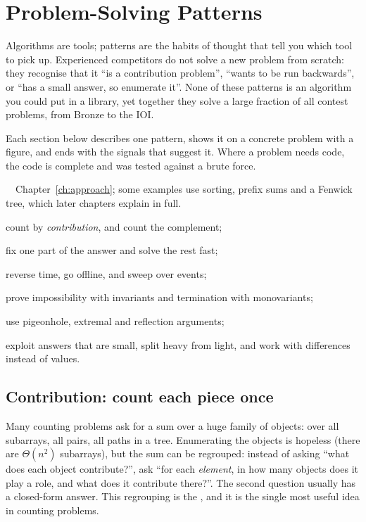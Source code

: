 \chapter{Problem-Solving Patterns}\label{ch:patterns}

Algorithms are tools; patterns are the habits of thought that tell you which tool to pick up. Experienced competitors do not
solve a new problem from scratch: they recognise that it ``is a contribution problem'', ``wants to be run backwards'', or
``has a small answer, so enumerate it''. None of these patterns is an algorithm you could put in a library, yet together
they solve a large fraction of all contest problems, from Bronze to the IOI.

Each section below describes one pattern, shows it on a concrete problem with a figure, and ends with the signals that
suggest it. Where a problem needs code, the code is complete and was tested against a brute force.

\begin{chapterintro}{\silver\ \gold\ \plat}{Chapter~\ref{ch:approach}; some examples use sorting, prefix sums and a Fenwick
tree, which later chapters explain in full.}
  \item count by \emph{contribution}, and count the complement;
  \item fix one part of the answer and solve the rest fast;
  \item reverse time, go offline, and sweep over events;
  \item prove impossibility with invariants and termination with monovariants;
  \item use pigeonhole, extremal and reflection arguments;
  \item exploit answers that are small, split heavy from light, and work with differences instead of values.
\end{chapterintro}

\section[Contribution: count each piece once]{Contribution: count each piece once \hfill \gold}\label{sec:contribution}

Many counting problems ask for a sum over a huge family of objects: over all subarrays, all pairs, all paths in a tree.
Enumerating the objects is hopeless (there are $\Theta(n^2)$ subarrays), but the sum can be regrouped: instead of asking
``what does each object contribute?'', ask ``for each \emph{element}, in how many objects does it play a role, and what does
it contribute there?''. The second question usually has a closed-form answer. This regrouping is the , and it is the single most useful idea in counting problems.

